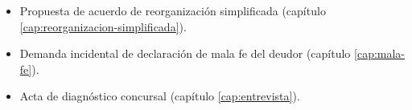 \begin{itemize}
  \item Propuesta de acuerdo de reorganización simplificada (capítulo
    \ref{cap:reorganizacion-simplificada}).
  \item Demanda incidental de declaración de mala fe del deudor (capítulo
    \ref{cap:mala-fe}).
  \item Acta de diagnóstico concursal (capítulo \ref{cap:entrevista}).
\end{itemize}

